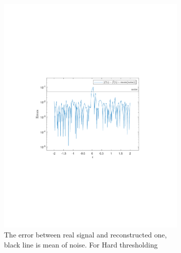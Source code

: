 \documentclass[a4paper]{article}
\begin{document}
    \begin{figure}[H]
	\begin{subfigure}{0.49\textwidth}
	\centering
\includegraphics[trim={3.5cm 8cm 4cm 9cm},clip,width=1\textwidth]{Images/DeltaOpti.pdf}
\caption{The error between real signal and reconstructed one, black line is mean of noise. For Hard thresholding}
\label{sub:BestDelta}
\end{subfigure}
\begin{subfigure}{0.49\textwidth}
	\centering

\end{subfigure}
\end{figure}
\end{document}
